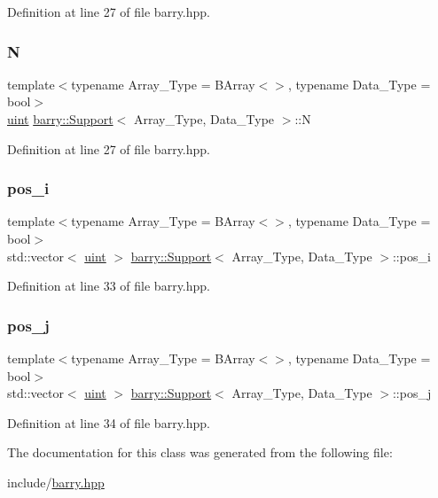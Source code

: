 Definition at line 27 of file barry.\+hpp.

\mbox{\label{classbarry_1_1_support_a1e3158ceae716505cb0c5fb14374be9b}} 
\subsubsection{\texorpdfstring{N}{N}}
{\footnotesize\ttfamily template$<$typename Array\+\_\+\+Type  = B\+Array$<$$>$, typename Data\+\_\+\+Type  = bool$>$ \\
\hyperlink{namespacebarry_a11dfc53ddb4672278319aa04f1e09a6c}{uint} \hyperlink{classbarry_1_1_support}{barry\+::\+Support}$<$ Array\+\_\+\+Type, Data\+\_\+\+Type $>$\+::N}



Definition at line 27 of file barry.\+hpp.

\mbox{\label{classbarry_1_1_support_ac6012c953dd04c2e74c2105b193f50ac}} 
\subsubsection{\texorpdfstring{pos\+\_\+i}{pos\_i}}
{\footnotesize\ttfamily template$<$typename Array\+\_\+\+Type  = B\+Array$<$$>$, typename Data\+\_\+\+Type  = bool$>$ \\
std\+::vector$<$ \hyperlink{namespacebarry_a11dfc53ddb4672278319aa04f1e09a6c}{uint} $>$ \hyperlink{classbarry_1_1_support}{barry\+::\+Support}$<$ Array\+\_\+\+Type, Data\+\_\+\+Type $>$\+::pos\+\_\+i}



Definition at line 33 of file barry.\+hpp.

\mbox{\label{classbarry_1_1_support_a5aeba4c4447efe7523abfb1cef864e63}} 
\subsubsection{\texorpdfstring{pos\+\_\+j}{pos\_j}}
{\footnotesize\ttfamily template$<$typename Array\+\_\+\+Type  = B\+Array$<$$>$, typename Data\+\_\+\+Type  = bool$>$ \\
std\+::vector$<$ \hyperlink{namespacebarry_a11dfc53ddb4672278319aa04f1e09a6c}{uint} $>$ \hyperlink{classbarry_1_1_support}{barry\+::\+Support}$<$ Array\+\_\+\+Type, Data\+\_\+\+Type $>$\+::pos\+\_\+j}



Definition at line 34 of file barry.\+hpp.



The documentation for this class was generated from the following file\+:\begin{DoxyCompactItemize}
\item 
include/\hyperlink{barry_8hpp}{barry.\+hpp}\end{DoxyCompactItemize}
